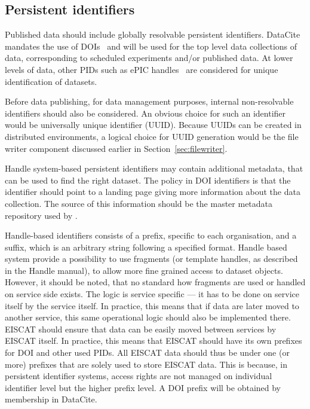 \documentclass[12pt,a4paper]{article}
\begin{document}
\subsection{Persistent identifiers}
Published data should include globally resolvable persistent identifiers. 
DataCite mandates the use of DOIs~\cite{doi} and will be used for the top level data collections of \ED data, corresponding to scheduled experiments and/or published data.
At lower levels of data, other PIDs such as ePIC handles~\cite{epic} are considered for unique identification of datasets.

Before data publishing, for data management purposes, internal non-resolvable identifiers should also be considered.
An obvious choice for such an identifier would be universally unique identifier (UUID). 
Because UUIDs can be created in distributed environments, a logical choice for UUID generation would be the file writer component discussed earlier in Section~\ref{sec:filewriter}.



Handle system-based persistent identifiers may contain additional metadata, that can be used to find the right dataset.  
The policy in DOI identifiers is that the identifier should point to a landing page giving more information about the data collection. 
The source of this information  should be the master metadata repository used by \ED.

Handle-based identifiers consists of a prefix, specific to each organisation, and a suffix, which is an arbitrary string following a specified format. 
Handle based system provide a possibility to use fragments (or template handles, as described in the Handle manual), to allow more fine grained access to dataset objects. 
However, it should be noted, that no standard how fragments are used or handled on service side exists. The logic is service specific --- it has to be done on service itself by the service itself. 
In practice, this means that if data are later moved to another service, this same operational logic should also be implemented there. 
EISCAT should ensure that data can be easily moved between services by EISCAT itself. 
In practice, this means that EISCAT should have its own prefixes for DOI and other used PIDs. 
All EISCAT data should thus be under one (or more) prefixes that are solely used to store EISCAT data. 
This is because, in persistent identifier systems, access rights are not managed on individual identifier level but the higher prefix level. 
A DOI prefix will be obtained by membership in DataCite.
\end{document}
